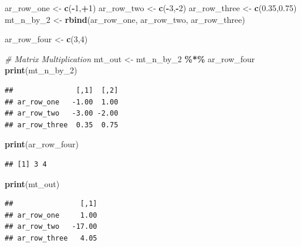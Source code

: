 \documentclass[
]{book}
\newenvironment{Shaded}{\begin{snugshade}}{\end{snugshade}}
\newcommand{\CommentTok}[1]{\textcolor[rgb]{0.56,0.35,0.01}{\textit{#1}}}
\newcommand{\DecValTok}[1]{\textcolor[rgb]{0.00,0.00,0.81}{#1}}
\newcommand{\FloatTok}[1]{\textcolor[rgb]{0.00,0.00,0.81}{#1}}
\newcommand{\KeywordTok}[1]{\textcolor[rgb]{0.13,0.29,0.53}{\textbf{#1}}}
\newcommand{\NormalTok}[1]{#1}
\newcommand{\OperatorTok}[1]{\textcolor[rgb]{0.81,0.36,0.00}{\textbf{#1}}}
\newcommand{\StringTok}[1]{\textcolor[rgb]{0.31,0.60,0.02}{#1}}
\begin{document}
\begin{Shaded}
\begin{Highlighting}[]
\NormalTok{ar\_row\_one \textless{}{-}}\StringTok{ }\KeywordTok{c}\NormalTok{(}\OperatorTok{{-}}\DecValTok{1}\NormalTok{,}\OperatorTok{+}\DecValTok{1}\NormalTok{)}
\NormalTok{ar\_row\_two \textless{}{-}}\StringTok{ }\KeywordTok{c}\NormalTok{(}\OperatorTok{{-}}\DecValTok{3}\NormalTok{,}\OperatorTok{{-}}\DecValTok{2}\NormalTok{)}
\NormalTok{ar\_row\_three \textless{}{-}}\StringTok{ }\KeywordTok{c}\NormalTok{(}\FloatTok{0.35}\NormalTok{,}\FloatTok{0.75}\NormalTok{)}
\NormalTok{mt\_n\_by\_}\DecValTok{2}\NormalTok{ \textless{}{-}}\StringTok{ }\KeywordTok{rbind}\NormalTok{(ar\_row\_one, ar\_row\_two, ar\_row\_three)}

\NormalTok{ar\_row\_four \textless{}{-}}\StringTok{ }\KeywordTok{c}\NormalTok{(}\DecValTok{3}\NormalTok{,}\DecValTok{4}\NormalTok{)}

\CommentTok{\# Matrix Multiplication}
\NormalTok{mt\_out \textless{}{-}}\StringTok{ }\NormalTok{mt\_n\_by\_}\DecValTok{2} \OperatorTok{\%*\%}\StringTok{ }\NormalTok{ar\_row\_four}
\KeywordTok{print}\NormalTok{(mt\_n\_by\_}\DecValTok{2}\NormalTok{)}
\end{Highlighting}
\end{Shaded}

\begin{verbatim}
##               [,1]  [,2]
## ar_row_one   -1.00  1.00
## ar_row_two   -3.00 -2.00
## ar_row_three  0.35  0.75
\end{verbatim}

\begin{Shaded}
\begin{Highlighting}[]
\KeywordTok{print}\NormalTok{(ar\_row\_four)}
\end{Highlighting}
\end{Shaded}

\begin{verbatim}
## [1] 3 4
\end{verbatim}

\begin{Shaded}
\begin{Highlighting}[]
\KeywordTok{print}\NormalTok{(mt\_out)}
\end{Highlighting}
\end{Shaded}

\begin{verbatim}
##                [,1]
## ar_row_one     1.00
## ar_row_two   -17.00
## ar_row_three   4.05
\end{verbatim}
\end{document}
